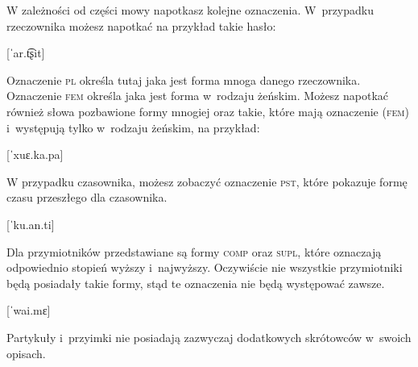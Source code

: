 \begin{spacing}{1.1}
W zależności od części mowy napotkasz kolejne oznaczenia. W~przypadku rzeczownika możesz napotkać na przykład takie hasło:

[ˈar.t͡ʂit]
\skipline

Oznaczenie \textsc{pl} określa tutaj jaka jest forma mnoga danego rzeczownika. Oznaczenie \textsc{fem} określa jaka jest forma w~rodzaju żeńskim. Możesz napotkać również słowa pozbawione formy mnogiej oraz takie, które mają oznaczenie (\textsc{fem}) i~występują tylko w~rodzaju żeńskim, na przykład:

[ˈxuɛ.ka.pa]
\skipline

W przypadku czasownika, możesz zobaczyć oznaczenie \textsc{pst}, które pokazuje formę czasu przeszłego dla czasownika.

[ˈku.an.ti]
\skipline

Dla przymiotników przedstawiane są formy \textsc{comp} oraz \textsc{supl}, które oznaczają odpowiednio stopień wyższy i~najwyższy. Oczywiście nie wszystkie przymiotniki będą posiadały takie formy, stąd te oznaczenia nie będą występować zawsze.

[ˈwai.mɛ]
\skipline

Partykuły i~przyimki nie posiadają zazwyczaj dodatkowych skrótowców w~swoich opisach.

\skipline

\end{spacing}